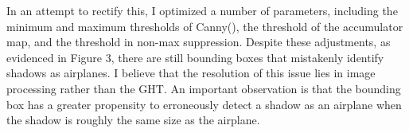 \documentclass[10pt]{article}
\begin{document}
In an attempt to rectify this, I optimized a number of parameters, including the minimum and maximum thresholds of Canny(), the threshold of the accumulator map, and the threshold in non-max suppression. Despite these adjustments, as evidenced in Figure 3, there are still bounding boxes that mistakenly identify shadows as airplanes. I believe that the resolution of this issue lies in image processing rather than the GHT.
An important observation is that the bounding box has a greater propensity to erroneously detect a shadow as an airplane when the shadow is roughly the same size as the airplane. 
\end{document}

